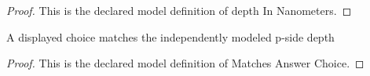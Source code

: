 \begin{proof}
  This is the declared model definition of depth In Nanometers.
\end{proof}
\begin{definition}
  \label{def:physics:phyx-mini-0630:phyxminiproblems-problemphyxmini0630-matchesanswerchoice}
  A displayed choice matches the independently modeled p-side depth
\end{definition}
\begin{proof}
  This is the declared model definition of Matches Answer Choice.
\end{proof}
